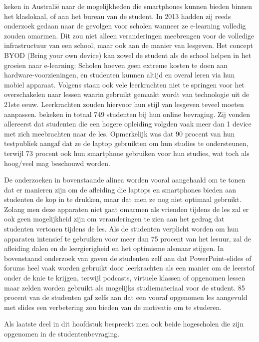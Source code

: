 \textcite{Farley2015} keken in Australië naar de mogelijkheden die smartphones kunnen bieden binnen het klaslokaal, of aan het bureau van de student. In 2013 hadden zij reeds onderzoek gedaan naar de gevolgen voor scholen wanneer ze e-learning volledig zouden omarmen. Dit zou niet alleen veranderingen meebrengen voor de volledige infrastructuur van een school, maar ook aan de manier van lesgeven. Het concept BYOD (Bring your own device) kan zowel de student als de school helpen in het groeien naar e-learning: Scholen hoeven geen extreme kosten te doen aan hardware-voorzieningen, en studenten kunnen altijd en overal leren via hun mobiel apparaat. Volgens \textcite{Crompton2014} staan ook vele leerkrachten niet te springen voor het overschakelen naar lessen waarin gebruikt gemaakt wordt van technologie uit de 21ste eeuw. Leerkrachten zouden hiervoor hun stijl van lesgeven teveel moeten aanpassen. \textcite{Farley2015} bekeken in totaal 749 studenten bij hun online bevraging. Zij vonden allereerst dat studenten die een hogere opleiding volgden vaak meer dan 1 device met zich meebrachten naar de les. Opmerkelijk was dat 90 procent van hun testpubliek aangaf dat ze de laptop gebruikten om hun studies te ondersteunen, terwijl 73 procent ook hun smartphone gebruiken voor hun studies, wat toch als hoog/veel mag beschouwd worden. 

De onderzoeken in bovenstaande alinea worden vooral aangehaald om te tonen dat er manieren zijn om de afleiding die laptops en smartphones bieden aan studenten de kop in te drukken, maar dat men ze nog niet optimaal gebruikt. Zolang men deze apparaten niet gaat omarmen als vrienden tijdens de les zal er ook geen mogelijkheid zijn om veranderingen te zien aan het gedrag dat studenten vertonen tijdens de les. Als de studenten verplicht worden om hun apparaten intensief te gebruiken voor meer dan 75 procent van het lesuur, zal de afleiding dalen en de leergierigheid en het optimisme alsmaar stijgen. In bovenstaand onderzoek van \textcite{Farley2015} gaven de studenten zelf aan dat PowerPoint-slides of forums heel vaak worden gebruikt door leerkrachten als een manier om de leerstof onder de knie te krijgen, terwijl podcasts, virtuele klassen of opgenomen lessen maar zelden worden gebruikt als mogelijks studiemateriaal voor de student. 85 procent van de studenten gaf zelfs aan dat een vooraf opgenomen les aangevuld met slides een verbetering zou bieden van de motivatie om te studeren.

Als laatste deel in dit hoofdstuk bespreekt men ook beide hogescholen die zijn opgenomen in de studentenbevraging.

